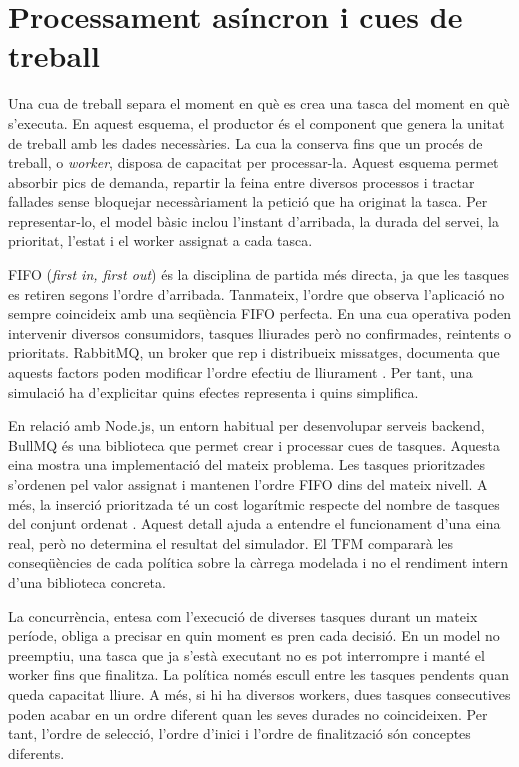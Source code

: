 \section{Processament asíncron i cues de treball}

Una cua de treball separa el moment en què es crea una tasca del moment en què
s'executa. En aquest esquema, el productor és el component que genera la unitat
de treball amb les dades necessàries. La cua la conserva fins que un procés de
treball, o \emph{worker}, disposa de capacitat per processar-la. Aquest esquema
permet absorbir pics de demanda, repartir la feina entre diversos processos i
tractar fallades sense bloquejar necessàriament la petició que ha originat la
tasca. Per representar-lo, el model bàsic inclou l'instant d'arribada, la durada
del servei, la prioritat, l'estat i el worker assignat a cada tasca.

FIFO (\emph{first in, first out}) és la disciplina de partida més directa, ja
que les tasques es retiren segons l'ordre d'arribada. Tanmateix, l'ordre que
observa l'aplicació no sempre coincideix amb una seqüència FIFO perfecta. En una
cua operativa poden intervenir diversos consumidors, tasques lliurades però no
confirmades, reintents o prioritats. RabbitMQ, un broker que rep i distribueix
missatges, documenta que aquests factors poden modificar l'ordre efectiu de
lliurament \parencite{rabbitmqPriority}. Per tant, una simulació ha d'explicitar
quins efectes representa i quins simplifica.

En relació amb Node.js, un entorn habitual per desenvolupar serveis backend,
BullMQ és una biblioteca que permet crear i processar cues de tasques. Aquesta
eina mostra una implementació del mateix problema. Les tasques prioritzades
s'ordenen pel valor assignat i mantenen l'ordre FIFO dins del mateix nivell. A
més, la inserció prioritzada té un cost logarítmic respecte del nombre de
tasques del conjunt ordenat
\parencite{bullmqPrioritized}. Aquest detall ajuda a entendre el funcionament
d'una eina real, però no determina el resultat del simulador. El TFM compararà
les conseqüències de cada política sobre la càrrega modelada i no el rendiment
intern d'una biblioteca concreta.

La concurrència, entesa com l'execució de diverses tasques durant un mateix
període, obliga a precisar en quin moment es pren cada decisió. En un model no
preemptiu, una tasca que ja s'està executant no es pot interrompre i manté el
worker fins que finalitza. La política només escull entre les tasques pendents
quan queda capacitat lliure. A més, si hi ha diversos workers, dues tasques
consecutives poden acabar en un ordre diferent quan les seves durades no
coincideixen. Per tant, l'ordre de selecció, l'ordre d'inici i l'ordre de
finalització són conceptes diferents.

